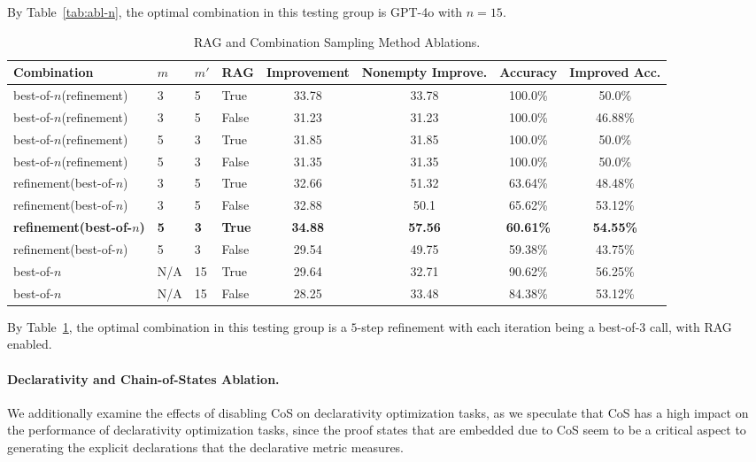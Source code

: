 By Table~\ref{tab:abl-n}, the optimal combination in this testing group is GPT-4o with $n=15$.

\begin{table}[h]
\caption{RAG and Combination Sampling Method Ablations.}
\label{tab:abl-rag}
\centering
\small
\begin{tabular}{llll|cccc}
\toprule
Combination & $m$ & $m'$ & RAG & Improvement & Nonempty Improve. & Accuracy & Improved Acc.\\
\midrule
best-of-$n$(refinement) & 3 & 5 & True & 33.78 & 33.78 & 100.0\% & 50.0\% \\
best-of-$n$(refinement) & 3 & 5 & False & 31.23 & 31.23 & 100.0\% & 46.88\% \\
best-of-$n$(refinement) & 5 & 3 & True & 31.85 & 31.85 & 100.0\% & 50.0\% \\
best-of-$n$(refinement) & 5 & 3 & False & 31.35 & 31.35 & 100.0\% & 50.0\% \\
refinement(best-of-$n$) & 3 & 5 & True & 32.66 & 51.32 & 63.64\% & 48.48\% \\
refinement(best-of-$n$) & 3 & 5 & False & 32.88 & 50.1 & 65.62\% & 53.12\% \\
\textbf{refinement(best-of-$n$)} & \textbf{5} & \textbf{3} & \textbf{True} & \textbf{34.88} & \textbf{57.56} & \textbf{60.61\%} & \textbf{54.55\%} \\
refinement(best-of-$n$) & 5 & 3 & False & 29.54 & 49.75 & 59.38\% & 43.75\% \\
best-of-$n$ & N/A & 15 & True & 29.64 & 32.71 & 90.62\% & 56.25\% \\
best-of-$n$ & N/A & 15 & False & 28.25 & 33.48 & 84.38\% & 53.12\% \\
\bottomrule
\end{tabular}
\end{table}

By Table~\ref{tab:abl-rag}, the optimal combination in this testing group is a $5$-step refinement with each iteration being a best-of-$3$ call, with RAG enabled.

\paragraph{Declarativity and Chain-of-States Ablation.} We additionally examine the effects of disabling CoS on declarativity optimization tasks, as we speculate that CoS has a high impact on the performance of declarativity optimization tasks, since the proof states that are embedded due to CoS seem to be a critical aspect to generating the explicit declarations that the declarative metric measures.


